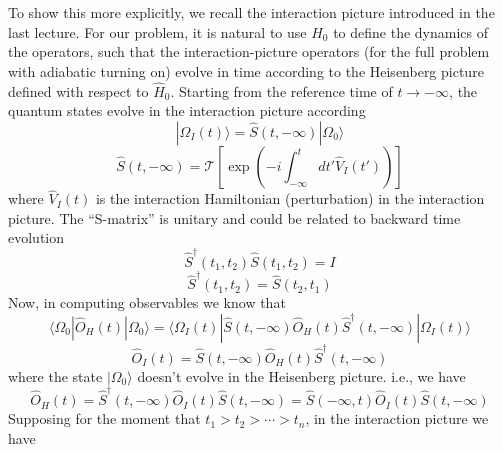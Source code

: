 To show this more explicitly, we recall the interaction picture introduced in the last lecture. For our problem, it is natural to use $\hat{H}_0$ to define the dynamics of the operators, such that the interaction-picture operators (for the full problem with adiabatic turning on) evolve in time according to the Heisenberg picture defined with respect to $\hat{H}_0$. Starting from the reference time of $t\to -\infty$, the quantum states evolve in the interaction picture according
\[ |\Omega _I\left( t \right) \rangle =\hat{S}\left( t,-\infty \right) |\Omega _0\rangle \]
\[ \hat{S}\left( t,-\infty \right) =\mathcal{T} \left[ \exp \left( -i\int_{-\infty}^t{dt'\hat{V}_I\left( t' \right)} \right) \right] \]
where $\hat{V}_I(t)$ is the interaction Hamiltonian (perturbation) in the interaction picture. The ``S-matrix'' is unitary and could be related to backward time evolution
\[ \hat{S}^{\dagger}\left( t_1,t_2 \right) \hat{S}\left( t_1,t_2 \right) =I\]
\[ \hat{S}^{\dagger}\left( t_1,t_2 \right) =\hat{S}\left( t_2,t_1 \right) \]
Now, in computing observables we know that
\[ \langle \Omega _0|\hat{O}_H\left( t \right) |\Omega _0\rangle =\langle \Omega _I\left( t \right) |\hat{S}\left( t,-\infty \right) \hat{O}_H\left( t \right) \hat{S}^{\dagger}\left( t,-\infty \right) |\Omega _I\left( t \right) \rangle \]
\[ \hat{O}_I\left( t \right) =\hat{S}\left( t,-\infty \right) \hat{O}_H\left( t \right) \hat{S}^{\dagger}\left( t,-\infty \right) \]
where the state $|\Omega_0\rangle$ doesn't evolve in the Heisenberg picture. i.e., we have
\[ \hat{O}_H\left( t \right) =\hat{S}^{\dagger}\left( t,-\infty \right) \hat{O}_I\left( t \right) \hat{S}\left( t,-\infty \right) =\hat{S}\left( -\infty ,t \right) \hat{O}_I\left( t \right) \hat{S}\left( t,-\infty \right) \]
Supposing for the moment that $t_1>t_2>\cdots >t_n$, in the interaction picture we have
